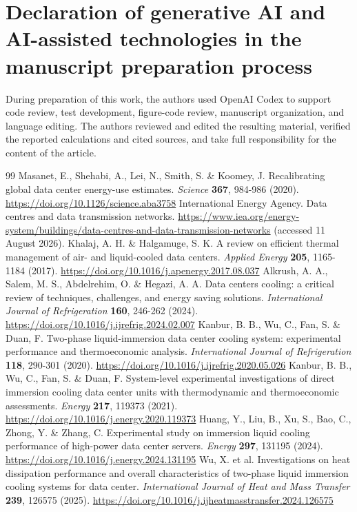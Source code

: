 \documentclass[review,12pt]{elsarticle}
\begin{document}
\section{Declaration of generative AI and AI-assisted technologies in the manuscript preparation process}
During preparation of this work, the authors used OpenAI Codex to support code review, test development, figure-code review, manuscript organization, and language editing. The authors reviewed and edited the resulting material, verified the reported calculations and cited sources, and take full responsibility for the content of the article.

\begin{thebibliography}{99}
 Masanet, E., Shehabi, A., Lei, N., Smith, S. \& Koomey, J. Recalibrating global data center energy-use estimates. \textit{Science} \textbf{367}, 984-986 (2020). \url{https://doi.org/10.1126/science.aba3758}
 International Energy Agency. Data centres and data transmission networks. \url{https://www.iea.org/energy-system/buildings/data-centres-and-data-transmission-networks} (accessed 11 August 2026).
 Khalaj, A. H. \& Halgamuge, S. K. A review on efficient thermal management of air- and liquid-cooled data centers. \textit{Applied Energy} \textbf{205}, 1165-1184 (2017). \url{https://doi.org/10.1016/j.apenergy.2017.08.037}
 Alkrush, A. A., Salem, M. S., Abdelrehim, O. \& Hegazi, A. A. Data centers cooling: a critical review of techniques, challenges, and energy saving solutions. \textit{International Journal of Refrigeration} \textbf{160}, 246-262 (2024). \url{https://doi.org/10.1016/j.ijrefrig.2024.02.007}
 Kanbur, B. B., Wu, C., Fan, S. \& Duan, F. Two-phase liquid-immersion data center cooling system: experimental performance and thermoeconomic analysis. \textit{International Journal of Refrigeration} \textbf{118}, 290-301 (2020). \url{https://doi.org/10.1016/j.ijrefrig.2020.05.026}
 Kanbur, B. B., Wu, C., Fan, S. \& Duan, F. System-level experimental investigations of direct immersion cooling data center units with thermodynamic and thermoeconomic assessments. \textit{Energy} \textbf{217}, 119373 (2021). \url{https://doi.org/10.1016/j.energy.2020.119373}
 Huang, Y., Liu, B., Xu, S., Bao, C., Zhong, Y. \& Zhang, C. Experimental study on immersion liquid cooling performance of high-power data center servers. \textit{Energy} \textbf{297}, 131195 (2024). \url{https://doi.org/10.1016/j.energy.2024.131195}
 Wu, X. et al. Investigations on heat dissipation performance and overall characteristics of two-phase liquid immersion cooling systems for data center. \textit{International Journal of Heat and Mass Transfer} \textbf{239}, 126575 (2025). \url{https://doi.org/10.1016/j.ijheatmasstransfer.2024.126575}

\end{thebibliography}
\end{document}
